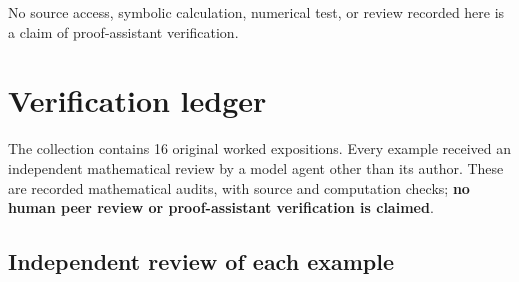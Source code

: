 \documentclass[
  11pt,
]{article}
\begin{document}
No source access, symbolic calculation, numerical test, or review
recorded here is a claim of proof-assistant verification.

\section{Verification ledger}\label{verification}

The collection contains 16 original worked expositions. Every example
received an independent mathematical review by a model agent other than
its author. These are recorded mathematical audits, with source and
computation checks; \textbf{no human peer review or proof-assistant
verification is claimed}.

\subsection{Independent review of each
example}\label{independent-review-of-each-example}
\end{document}
